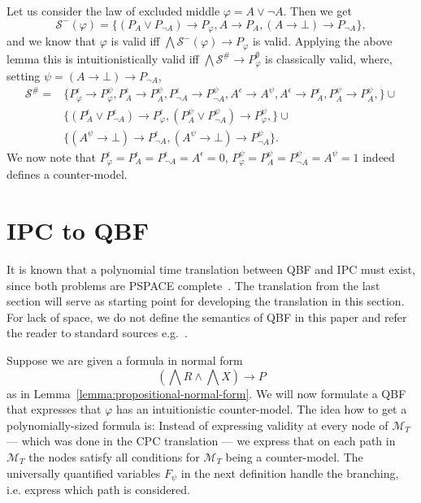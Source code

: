 \documentclass[runningheads]{llncs}
\begin{document}
\begin{example}
	Let us consider the law of excluded middle $\varphi = A\vee\neg A$. Then we get
	$$\mathcal S^-(\varphi) = \{(P_A\vee P_{\neg A})\to P_\varphi, A\to P_A, (A\to \bot)\to P_{\neg A}\},$$
	and we know that $\varphi$ is valid iff $\bigwedge \mathcal S^-(\varphi)\to P_\varphi$ is valid. Applying the above lemma this is intuitionistically valid iff $\bigwedge\mathcal S^\#\to P^\emptyset_\varphi$ is classically valid, where, setting $\psi = (A\to \bot)\to P_{\neg A}$,
	\begin{align*}
		\mathcal S^\# =&\{P_\varphi^\epsilon\to P_\varphi^{\psi}, P_A^\epsilon\to P_A^{\psi},P_{\neg A}^\epsilon\to P_{\neg A}^{\psi},A^\epsilon\to A^{\psi},A^\epsilon\to P_A^\epsilon, P_A^{\psi}\to P_A^{\psi}, \}\cup\\ &\{(P_A^\epsilon\vee P_{\neg A}^\epsilon)\to P_\varphi^\epsilon, (P_A^{\psi}\vee P_{\neg A}^{\psi})\to P_\varphi^{\psi},\}\cup\\&\{(A^{\psi}\to \bot)\to P_{\neg A}^\epsilon, (A^{\psi}\to \bot)\to P_{\neg A}^{\psi}\}.
	\end{align*}
	We now note that $P_\varphi^\epsilon  = P_A^\epsilon = P_{\neg A}^\epsilon = A^\epsilon = 0$, $P_{\varphi}^{\psi} = P_A^{\psi} =  P_{\neg A}^{\psi} = A^{\psi} = 1$ indeed defines a counter-model.
\end{example}	

\section{IPC to QBF}

It is known that a polynomial time translation between QBF and IPC must exist, since both problems are PSPACE complete~\cite{garey1979computers,statman1979intuitionistic}.
The translation from the last section will serve as starting point for developing the translation in this section.
For lack of space, we do not define the semantics of QBF in this paper and refer the reader to standard sources e.g.~\cite{series/faia/2009-185}.

Suppose we are given a formula in normal form $$\left(\bigwedge R\wedge\bigwedge X\right)\to P$$ as in Lemma~\ref{lemma:propositional-normal-form}. We will now formulate a QBF that expresses that $\varphi$ has an intuitionistic counter-model. The idea how to get a polynomially-sized formula is: Instead of expressing validity at every node of $\mathcal M_T$ --- which was done in the CPC translation --- we express that on each path in $\mathcal M_T$ the nodes satisfy all conditions for $\mathcal M_T$ being a counter-model. The universally quantified variables $F_\psi$ in the next definition handle the branching, i.e. express which path is considered.
\end{document}
